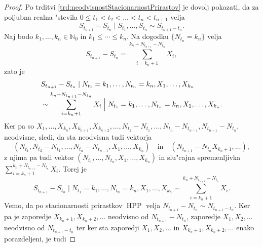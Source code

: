 \documentclass[12pt, a4paper, reqno]{amsart}
\theoremstyle{definition}
\theoremstyle{plain}
\newcommand{\N}{\mathbb{N}}
\newcommand{\1}{\mathds{1}}
\DeclareMathOperator{\HPP}{HPP}
\begin{document}
        \begin{proof}
            Po trditvi \ref{trd:neodvisnostStacionarnostPrirastov} je dovolj pokazati, da za poljubna 
            realna "stevila
            $0\leq t_1 < t_2 < \ldots< t_n < t_{n+1}$ velja 
            \begin{equation*}
                S_{t_{n+1}} - S_{t_n}\mid S_{t_1}, \dots, S_{t_n} \sim S_{t_{n+1} - t_n}.
            \end{equation*}
            Naj bodo $k_1, \dots, k_n \in \N_0$ in $k_1\leq \cdots \leq k_n$. Na dogodku 
            $\{N_{t_n} = k_n\}$ velja 
            \begin{equation*}
                S_{t_{n+1}} - S_{t_n} = \sum_{i = k_n + 1}^{k_n + N_{t_{n+1}} - N_{t_n}}X_i,
            \end{equation*}
            zato je 
            \begin{align*}
                &S_{t_{n+1}} - S_{t_n}\mid N_{t_1}= k_1, \dots, N_{t_n} = k_n, X_1, \dots, X_{k_n} \\
                &\sim \sum_{i = k_n + 1}^{k_n + N_{t_{n+1}} - N_{t_n}}X_i\Bigm| N_{t_1}= k_1, \dots, N_{t_n} = k_n, X_1, \dots, X_{k_n}.
            \end{align*}
            Ker pa so $X_1, \dots, X_{k_n}, X_{k_{n+1}}, X_{k_{n+2}}, \dots,
             N_{t_2} - N_{t_1}, \dots, N_{t_n} - N_{t_{n-1}}, N_{t_{n+1}} - N_{t_n}$, neodvisne, sledi, 
            da sta neodvisna tudi vektorja 
            $$(N_{t_1}, N_{t_2} - N_{t_1}, \dots, N_{t_n} - N_{t_{n-1}}, X_1, \dots, X_{k_n}) \quad \text{in} \quad
            (N_{t_{n+1}} - N_{t_n} X_{k_n + 1}, \dots),$$ z njima pa tudi vektor
            $(N_{t_1}, \dots, N_{t_n}, X_1, \dots, X_{k_n})$ in slu"cajna spremenljivka \newline
            $\sum_{i = k_n + 1}^{k_n + N_{t_{n+1}} - N_{t_n}}X_i$. Torej je
            \begin{equation*}
                S_{t_{n+1}} - S_{t_n}\mid N_{t_1} = k_1, \dots, N_{t_n} = k_n, X_1, \dots, X_{k_n} \sim
                \sum_{i = k_n + 1}^{k_n + N_{t_{n+1}} - N_{t_n}}X_i.
            \end{equation*}
            Vemo, da po stacionarnosti prirastkov $\HPP$ velja $N_{t_{n+1}} - N_{t_n} \sim N_{t_{n+1} - t_n}$. 
            Ker pa je zaporedje $X_{k_n + 1}, X_{k_n + 2}, \dots$ neodvisno od $N_{t_{n+1}} - N_{t_n}$,
            zaporedje $X_1, X_2, \dots$ neodvisno od $N_{t_{n+1} - t_n}$ ter ker sta zaporedji 
            $X_1, X_2, \dots$ in $X_{k_n + 1}, X_{k_n + 2}, \dots$ enako porazdeljeni, je tudi 

\end{proof}
\end{document}
